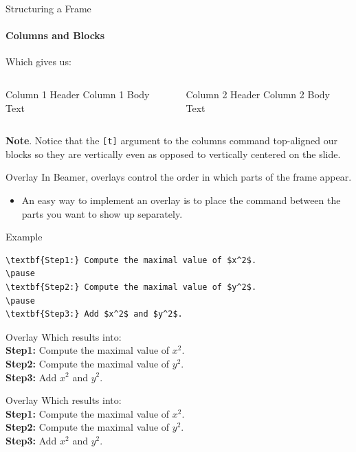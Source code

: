 \documentclass{bredelebeamer}
\begin{document}
\begin{frame}[fragile]{Structuring a Frame}\framesubtitle{Columns and Blocks}
\alert{Which gives us}:\\
\begin{columns}[t]
\begin{block}{Column 1 Header}
Column 1 Body Text
\end{block}
\begin{block}{Column 2 Header}
Column 2 Body Text
\end{block}
\end{columns}


\textbf{Note}. Notice that the \texttt{[t]} argument to the columns command top-aligned our blocks so they are vertically even as opposed to vertically centered on the slide.
\end{frame}


\begin{frame}[fragile]{Overlay}
In Beamer, overlays control the order in which parts of the frame
appear.
\begin{itemize}
\item An easy way to implement an overlay is to place the \texttt{\pause} command between the parts you want to show up separately.
\end{itemize}


\alert{Example}
\begin{center}
\begin{verbatim}
\textbf{Step1:} Compute the maximal value of $x^2$.
\pause
\textbf{Step2:} Compute the maximal value of $y^2$.
\pause
\textbf{Step3:} Add $x^2$ and $y^2$.
\end{verbatim}
\end{center}
\end{frame}


\begin{frame}[fragile]{Overlay}
\alert{Which results into:}\\

\textbf{Step1:} Compute the maximal value of $x^2$.\\
\pause
\textbf{Step2:} Compute the maximal value of $y^2$.\\
\pause
\textbf{Step3:} Add $x^2$ and $y^2$.
\end{frame}


\begin{frame}[fragile]{Overlay}
\alert{Which results into:}\\

\textbf{Step1:} Compute the maximal value of $x^2$.\\
\pause
\textbf{Step2:} Compute the maximal value of $y^2$.\\
\pause
\textbf{Step3:} Add $x^2$ and $y^2$.
\end{frame}
\end{document}

